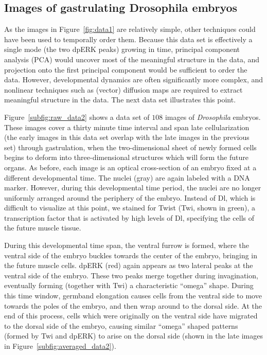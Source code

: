 \documentclass{pnastwo}
\begin{document}
\begin{article}
%

\subsection{Images of gastrulating  {\subsectionitfont Drosophila} embryos}

As the images in Figure~\ref{fig:data1} are relatively simple, other techniques could have been used to temporally order them.
%
Because this data set is effectively a single mode (the two dpERK peaks) growing in time,
principal component analysis (PCA) \cite{shlens2005tutorial} would uncover most of the meaningful structure in the data, and projection onto the first principal component would be sufficient to order the data.
%
However, developmental dynamics are often significantly more complex, and nonlinear techniques such as (vector) diffusion maps are required to extract meaningful structure in the data.
%
The next data set illustrates this point.

Figure~\ref{subfig:raw_data2} shows a data set of $108$ images of {\it Drosophila} embryos.
%
These images cover a thirty minute time interval and span late cellularization (the early images in this data set overlap with the late images in the previous set) through gastrulation, when the two-dimensional sheet of newly formed cells begins to deform into three-dimensional structures which will form the future organs.
%
As before, each image is an optical cross-section of an embryo fixed at a different developmental time.
%
The nuclei (gray) are again labeled with a DNA marker.
%
However, during this developmental time period, the nuclei are no longer uniformly arranged around the periphery of the embryo.
%
Instead of Dl, which is difficult to visualize at this point, we stained for Twist (Twi, shown in green), a transcription factor that is activated by high levels of Dl, specifying the cells of the future muscle tissue.
%

%
During this developmental time span, the ventral furrow is formed, where the ventral side of the embryo buckles towards the center of the embryo, bringing in the future muscle cells.
%
dpERK (red) again appears as two lateral peaks at the ventral side of the embryo.
%
These two peaks merge together during invagination, eventually forming (together with Twi) a characteristic ``omega'' shape.
%
During this time window, germband elongation causes cells from the ventral side to move towards the poles of the embryo, and then wrap around to the dorsal side.
%
At the end of this process, cells which were originally on the ventral side have migrated to the dorsal side of the embryo, causing similar ``omega'' shaped patterns (formed by Twi and dpERK) to arise on the dorsal side (shown in the late images in Figure~\ref{subfig:averaged_data2}).


\end{article}
\end{document}
